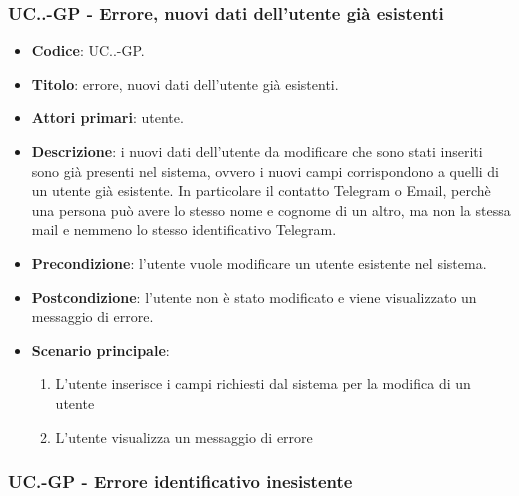 		\subsubsection{UC\theuccount.\thesubuccount.\thesubsubuccount-GP - Errore, nuovi dati dell'utente già esistenti}
		
		\begin{itemize}
			\item \textbf{Codice}: UC\theuccount.\thesubuccount.\thesubsubuccount-GP.
			\item \textbf{Titolo}: errore, nuovi dati dell'utente già esistenti.
			\item \textbf{Attori primari}: utente.
			\item \textbf{Descrizione}: i nuovi dati dell'utente da modificare che sono stati inseriti sono già presenti nel sistema, ovvero i nuovi campi corrispondono a quelli di un utente già esistente. In particolare il contatto Telegram o Email, perchè una persona può avere lo stesso nome e cognome di un altro, ma non la stessa mail e nemmeno lo stesso identificativo Telegram.
			\item \textbf{Precondizione}: l'utente vuole modificare un utente esistente nel sistema.
			\item \textbf{Postcondizione}: l'utente non è stato modificato e viene visualizzato un messaggio di errore.
			\item \textbf{Scenario principale}:
			\begin{enumerate}
				\item L'utente inserisce i campi richiesti dal sistema per la modifica di un utente
				\item L'utente visualizza un messaggio di errore
			\end{enumerate}
		\end{itemize}
	\subsubsection{UC\theuccount.\thesubuccount-GP - Errore identificativo inesistente}
		
